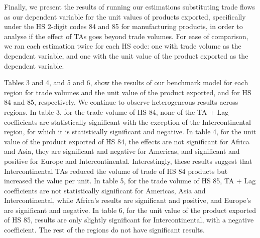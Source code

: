 Finally, we present the results of running our estimations substituting
trade flows as our dependent variable for the unit values of products
exported, specifically under the HS 2-digit codes 84 and 85 for
manufacturing products, in order to analyse if the effect of TAs goes
beyond trade volumes. For ease of comparison, we ran each estimation
twice for each HS code: one with trade volume as the dependent variable,
and one with the unit value of the product exported as the dependent
variable.

Tables 3 and 4, and 5 and 6, show the results of our benchmark model for
each region for trade volumes and the unit value of the product
exported, and for HS 84 and 85, respectively. We continue to observe
heterogeneous results across regions. In table 3, for the trade volume
of HS 84, none of the TA + Lag coefficients are statistically
significant with the exception of the Intercontinental region, for which
it is statistically significant and negative. In table 4, for the unit
value of the product exported of HS 84, the effects are not significant
for Africa and Asia, they are significant and negative for Americas, and
significant and positive for Europe and Intercontinental. Interestingly,
these results suggest that Intercontinental TAs reduced the volume of
trade of HS 84 products but increased the value per unit. In table 5,
for the trade volume of HS 85, TA + Lag coefficients are not
statistically significant for Americas, Asia and Intercontinental, while
Africa's results are significant and positive, and Europe's are
significant and negative. In table 6, for the unit value of the product
exported of HS 85, results are only slightly significant for
Intercontinental, with a negative coefficient. The rest of the regions
do not have significant results.

